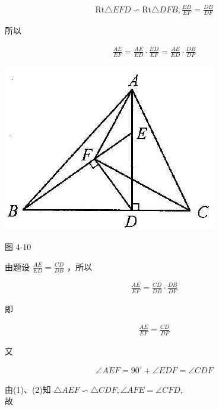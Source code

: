 \documentclass[10pt]{article}
\begin{document}
\begin{align*}
\mathrm{Rt} \triangle E F D \backsim \mathrm{Rt} \triangle D F B, \frac{E D}{E F}=\frac{D B}{D F}
\end{align*}

所以

\begin{align*}
\frac{A E}{E F}=\frac{A E}{E D} \cdot \frac{E D}{E F}=\frac{A E}{E D} \cdot \frac{D B}{D F}
\end{align*}

\begin{center}
\includegraphics[max width=\textwidth]{2024_10_30_2c8f45efd4a519b08e1ag-042}
\end{center}

图 4-10

由题设 $\frac{A E}{E D}=\frac{C D}{D B}$ ，所以

\begin{align*}
\frac{A E}{E F}=\frac{C D}{D B} \cdot \frac{D B}{D F}
\end{align*}

即

\begin{align*}
\frac{A E}{E F}=\frac{C D}{D F} \tag{1}
\end{align*}

又

\begin{align*}
\angle A E F=90^{\circ}+\angle E D F=\angle C D F \tag{2}
\end{align*}

由(1)、(2)知 $\triangle A E F \backsim \triangle C D F, \angle A F E=\angle C F D$,\\
故
\end{document}
